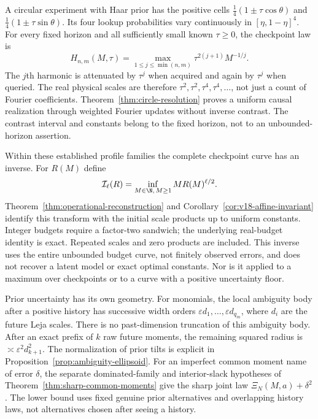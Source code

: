\documentclass[11pt]{amsart}
\theoremstyle{definition}\newtheorem{definition}[theorem]{Definition}
\theoremstyle{remark}\newtheorem{remark}[theorem]{Remark}
\begin{document}
A circular experiment with Haar prior has the positive cells
$\tfrac14(1\pm\tau\cos\theta)$ and
$\tfrac14(1\pm\tau\sin\theta)$. Its four lookup probabilities vary
continuously in $[\eta,1-\eta]^4$. For every fixed horizon and all
sufficiently small known $\tau\ge0$, the checkpoint law is
\[
 H_{n,m}(M,\tau)=
   \max_{1\le j\le\min(n,m)}\tau^{2(j+1)}M^{-1/j}.
\]
The $j$th harmonic is attenuated by $\tau^j$ when acquired and again
by $\tau^j$ when queried. The real physical scales are therefore
$\tau^2,\tau^2,\tau^4,\tau^4,\ldots$, not just a count of Fourier
coefficients. Theorem~\ref{thm:circle-resolution} proves a uniform
causal realization through weighted Fourier updates without inverse
contrast. The contrast interval and constants belong to the fixed
horizon, not to an unbounded-horizon assertion.

Within these established profile families the complete checkpoint curve
has an inverse. For $R(M)$ define
\[
 \mathcal I_\ell(R)=\inf_{M\in\N,\,M\ge1}M R(M)^{\ell/2}.
\]
Theorem~\ref{thm:operational-reconstruction} and
Corollary~\ref{cor:v18-affine-invariant} identify this transform with
the initial scale products up to uniform constants. Integer budgets
require a factor-two sandwich; the underlying real-budget identity is
exact. Repeated scales and zero products are included. This inverse
uses the entire unbounded budget curve, not finitely observed errors,
and does not recover a latent model or exact optimal constants. Nor is
it applied to a maximum over checkpoints or to a curve with a positive
uncertainty floor.

Prior uncertainty has its own geometry. For monomials, the local
ambiguity body after a positive history has successive width orders
$\varepsilon d_1,\ldots,\varepsilon d_{q_m}$, where $d_i$ are the
future Leja scales. There is no past-dimension truncation of this
ambiguity body. After an exact prefix of $k$ raw future moments,
the remaining squared radius is $\asymp\varepsilon^2d_{k+1}^2$.
The normalization of prior tilts is explicit in
Proposition~\ref{prop:ambiguity-ellipsoid}. For an imperfect common
moment name of error $\delta$, the separate dominated-family and
interior-slack hypotheses of Theorem~\ref{thm:sharp-common-moments}
give the sharp joint law $\Xi_N(M,a)+\delta^2$. The lower bound
uses fixed genuine prior alternatives and overlapping history laws,
not alternatives chosen after seeing a history.
\end{document}
